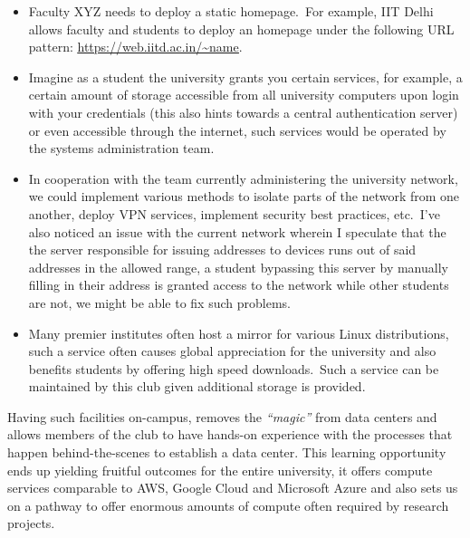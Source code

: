 \documentclass[a4paper,11pt,twocolumn,oneside]{book}
\begin{document}
    \begin{itemize}
        \item Faculty XYZ needs to deploy a static homepage.\ For example, IIT Delhi allows faculty and students to
        deploy an homepage under the following URL pattern:
        \href{https://web.iitd.ac.in/~name}{\color{blue}\underline{\url{https://web.iitd.ac.in/~name}}}.
        \item Imagine as a student the university grants you certain services, for example, a certain amount of storage
        accessible from all university computers upon login with your credentials (this also hints towards a central
        authentication server) or even accessible through the internet, such services would be operated by the systems
        administration team.
        \item In cooperation with the team currently administering the university network, we could implement various
        methods to isolate parts of the network from one another, deploy VPN services, implement security best
        practices, etc.\ I've also noticed an issue with the current network wherein I speculate that the the server
        responsible for issuing addresses to devices runs out of said addresses in the allowed range, a student
        bypassing this server by manually filling in their address is granted access to the network while other students
        are not, we might be able to fix such problems.
        \item Many premier institutes often host a mirror for various Linux distributions, such a service often causes
        global appreciation for the university and also benefits students by offering high speed downloads.\ Such a
        service can be maintained by this club given additional storage is provided.
    \end{itemize}

    Having such facilities on-campus, removes the \emph{``magic''} from data centers and allows members of the
    club to have hands-on experience with the processes that happen behind-the-scenes to establish a data center.
    This learning opportunity ends up yielding fruitful outcomes for the entire university, it offers compute
    services comparable to AWS, Google Cloud and Microsoft Azure and also sets us on a pathway to offer enormous
    amounts of compute often required by research projects.


\end{document}
